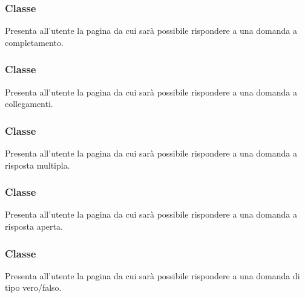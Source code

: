 \subsubsection{Classe }
Presenta all'utente la pagina da cui sarà possibile rispondere a una domanda a completamento.
\begin{itemize}
\end{itemize}
\subsubsection{Classe }
Presenta all'utente la pagina da cui sarà possibile rispondere a una domanda a collegamenti.
\begin{itemize}
\end{itemize}
\subsubsection{Classe }
Presenta all'utente la pagina da cui sarà possibile rispondere a una domanda a risposta multipla.
\begin{itemize}
\end{itemize}
\subsubsection{Classe }
Presenta all'utente la pagina da cui sarà possibile rispondere a una domanda a risposta aperta.
\begin{itemize}
\end{itemize}
\subsubsection{Classe }
Presenta all'utente la pagina da cui sarà possibile rispondere a una domanda di tipo vero/falso.
\begin{itemize}
\end{itemize}
